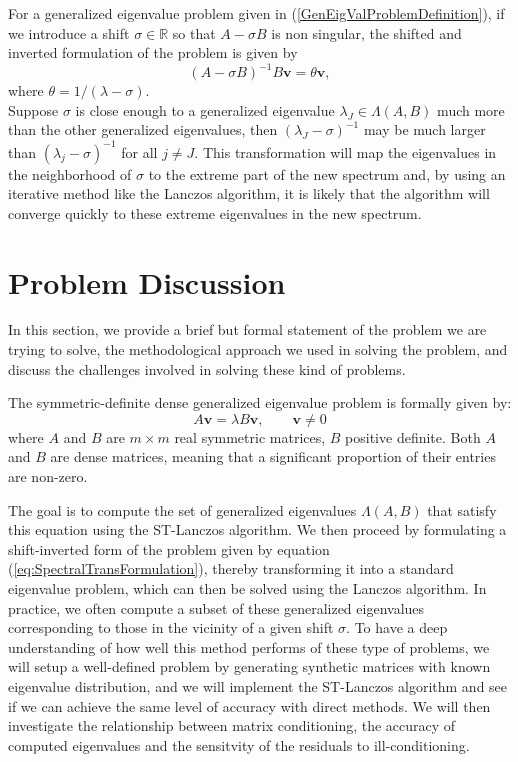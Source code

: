 For a generalized eigenvalue problem given in (\ref{GenEigValProblemDefinition}), if we introduce a shift $\sigma \in \mathbb{R}$ so that $A - \sigma B$ is non singular, the shifted and inverted formulation of the problem is given by
\begin{equation}\label{eq:SpectralTransFormulation}
	(A - \sigma B)^{-1} B\mathbf{v} = \theta \mathbf{v},
\end{equation}
where $\theta = 1 / (\lambda - \sigma)$.\\
Suppose $\sigma$ is close enough to a generalized eigenvalue $\lambda_J \in \Lambda(A, B)$ much more than the other generalized eigenvalues, then $(\lambda_J - \sigma)^{-1}$ may be much larger than $(\lambda_j - \sigma)^{-1}$ for all $j \neq J$. This transformation will map the eigenvalues in the neighborhood of $\sigma$ to the extreme part of the new spectrum and, by using an iterative method like the Lanczos algorithm, it is likely that the algorithm will converge quickly to these extreme eigenvalues in the new spectrum.

\section{Problem Discussion}\label{sec:ProblemDiscussion}
In this section, we provide a brief but formal statement of the problem we are trying to solve, the methodological approach we used in solving the problem, and discuss the challenges involved in solving these kind of problems.

The symmetric-definite dense generalized eigenvalue problem is formally given by:
\begin{equation}\label{eq:GenEigVal_Problem}
	A\mathbf{v} = \lambda B\mathbf{v}, \qquad \mathbf{v} \neq 0
\end{equation}
where $A$ and $B$ are $m \times m$ real symmetric matrices, $B$ positive definite. Both $A$ and $B$ are dense matrices, meaning that a significant proportion of their entries are non-zero.

The goal is to compute the set of generalized eigenvalues $\Lambda(A, B)$ that satisfy this equation using the ST-Lanczos algorithm. We then proceed by formulating a shift-inverted form of the problem given by equation (\ref{eq:SpectralTransFormulation}), thereby transforming it into a standard eigenvalue problem, which can then be solved using the Lanczos algorithm. In practice, we often compute a subset of these generalized eigenvalues corresponding to those in the vicinity of a given shift $\sigma$. To have a deep understanding of how well this method performs of these type of problems, we will setup a well-defined problem by generating synthetic matrices with known eigenvalue distribution, and we will implement the ST-Lanczos algorithm and see if we can achieve the same level of accuracy with direct methods. We will then investigate the relationship between matrix conditioning, the accuracy of computed eigenvalues and the sensitvity of the residuals to ill-conditioning.

